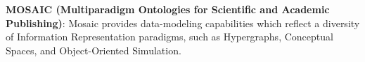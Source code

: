 \begin{frame}{}
{\begin{minipage}{1.2\textwidth}
{\begin{enumerate}
\dmitem \textbf{MOSAIC (Multiparadigm Ontologies 
	for Scientific and Academic Publishing)}: \hspace{.25em} 
Mosaic provides data-modeling capabilities which 
reflect a diversity of Information Representation 
paradigms, such as Hypergraphs, Conceptual Spaces, 
and Object-Oriented Simulation.  \\
\vspace{19pt}\hspace{11pt}\raisebox{12pt}{\MySquare}\hspace{11pt}\parbox{19cm}{{\color[rgb]{0.3,0,0.1}{Mosaic includes 
the Mosaic/HTXN Semantic Document Infoset (MH-SDI) and 
Mosaic Plugin Framework (MPF) (see slides 19-26).}}}
\vspace{19pt}  

\end{enumerate}
}

\end{minipage}
}


\end{frame}
